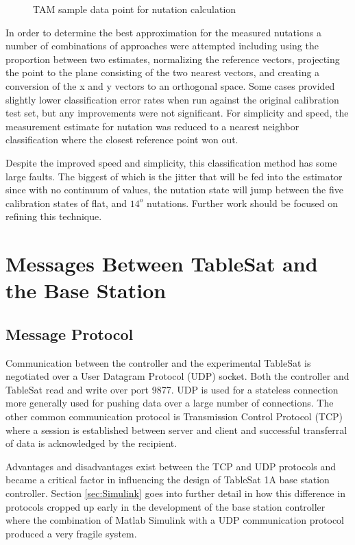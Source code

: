 \begin{figure}[H]
  \centerline{}
  \caption{TAM sample data point for nutation calculation}
  \label{fig:TAMPoint191}
\end{figure}

In order to determine the best approximation for the measured nutations a number of combinations of approaches were attempted including using the proportion between two estimates, normalizing the reference vectors, projecting the point to the plane consisting of the two nearest vectors, and creating a conversion of the x and y vectors to an orthogonal space.  Some cases provided slightly lower classification error rates when run against the original calibration test set, but any improvements were not significant.  For simplicity and speed, the measurement estimate for nutation was reduced to a nearest neighbor classification \cite{nearestneighbor} where the closest reference point won out.

Despite the improved speed and simplicity, this classification method has some large faults.  The biggest of which is the jitter that will be fed into the estimator since with no continuum of values, the nutation state will jump between the five calibration states of flat, and $14^o$ nutations.  Further work should be focused on refining this technique.

\section{Messages Between TableSat and the Base Station}


\subsection{Message Protocol}
\label{subsec:UDPTCP}

Communication between the controller and the experimental TableSat is negotiated over a User Datagram Protocol (UDP) socket.  Both the controller and TableSat read and write over port 9877.  UDP is used for a stateless connection more generally used for pushing data over a large number of connections.  The other common communication protocol is Transmission Control Protocol (TCP) where a session is established between server and client and successful transferral of data is acknowledged by the recipient.

Advantages and disadvantages exist between the TCP and UDP protocols and became a critical factor in influencing the design of TableSat 1A base station controller. Section \ref{sec:Simulink} goes into further detail in how this difference in protocols cropped up early in the development of the base station controller where the combination of Matlab Simulink with a UDP communication protocol produced a very fragile system.

